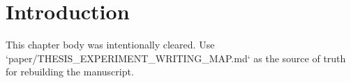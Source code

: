 \chapter{Introduction}
\label{ch:introduction}

This chapter body was intentionally cleared. Use `paper/THESIS_EXPERIMENT_WRITING_MAP.md` as the source of truth for rebuilding the manuscript.

